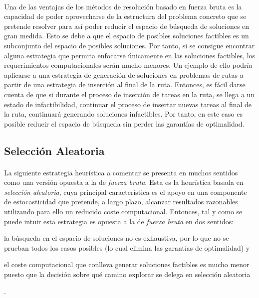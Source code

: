 \documentclass{subfiles}
\begin{document}
        \paragraph{}
        Una de las ventajas de los métodos de resolución basado en fuerza bruta es la capacidad de poder aprovecharse de la estructura del problema concreto que se pretende resolver para así poder reducir el espacio de búsqueda de soluciones en gran medida. Esto se debe a que el espacio de posibles soluciones factibles es un subconjunto del espacio de posibles soluciones. Por tanto, si se consigue encontrar alguna estrategia que permita enfocarse únicamente en las soluciones factibles, los requerimientos computacionales serán mucho menores. Un ejemplo de ello podría aplicarse a una estrategía de generación de soluciones en problemas de rutas a partir de una estrategia de inserción al final de la ruta. Entonces, es fácil darse cuenta de que si durante el proceso de inserción de tareas en la ruta, se llega a un estado de infactibilidad, continuar el proceso de insertar nuevas tareas al final de la ruta, continuará generando soluciones infactibles. Por tanto, en este caso es posible reducir el espacio de búsqueda sin perder las garantías de optimalidad.

      \subsection{Selección Aleatoria}
      \label{sec:solving_random}

        \paragraph{}
        La siguiente estrategia heurística a comentar se presenta en muchos sentidos como una versión opuesta a la de \emph{fuerza bruta}. Esta es la heurística basada en \emph{selección aleatoria}, cuya principal característica es el apoyo en una componente de estocasticidad que pretende, a largo plazo, alcanzar resultados razonables utilizando para ello un reducido coste computacional. Entonces, tal y como se puede intuir esta estrategia es opuesta a la de \emph{fuerza bruta} en dos sentidos: \begin{enumerate*}[label=(\arabic*)] \item la búsqueda en el espacio de soluciones no es exhaustiva, por lo que no se prueban todos los casos posibles (lo cual elimina las garantías de optimalidad) y \item el coste computacional que conlleva generar soluciones factibles es mucho menor puesto que la decisión sobre qué camino explorar se delega en selección aleatoria \end{enumerate*}.
\end{document}
